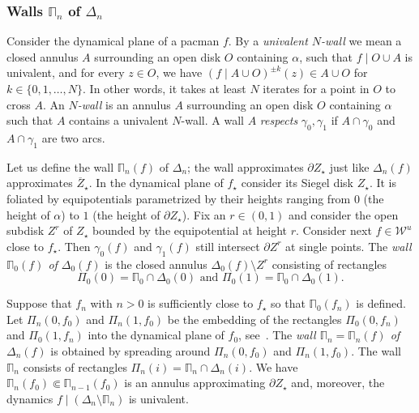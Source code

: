 \documentclass{amsart}
\newcommand{\1}{{\mathbb 1 }}
\newcommand{\bDelta}{{\mathbb{\Delta}}}
\newcommand{\bPi}{{\mathbb{\Pi}}}
\newcommand{\str}{{\star}}
\newcommand\WW{\mathcal{W}}
\theoremstyle{remark}
\numberwithin{equation}{section}
\theoremstyle{definition}
\theoremstyle{nonumberbreak}
\begin{document}
\subsubsection{Walls $\bPi_n$ of $\bDelta_n$}
\label{sss:walls bPi} Consider the dynamical plane of a pacman $f$. By a \emph{univalent $N$-wall} we mean a closed annulus $A$ surrounding an open disk $O$ containing $\alpha$, such that $f\mid O\cup A$ is univalent, and for every $z\in O$, we have $(f\mid A\cup O)^{\pm k}(z)\in A\cup O$ for $k\in\{0,1,\dots,  N\}$. In other words, it takes at least $N$ iterates for a point in $O$ to cross $A$. An \emph{$N$-wall} is an annulus $A$ surrounding an open disk $O$ containing $\alpha$ such that $A$ contains a univalent $N$-wall. A wall $A$ \emph{respects} $\gamma_0,\gamma_1$ if $A\cap \gamma_0$ and $A\cap \gamma_1$ are two arcs. 

Let us define the wall $\bPi_n(f)$ of $\bDelta_n$; the wall approximates $\partial Z_\str$ just like $\bDelta_n(f)$ approximates $\overline Z_\str$. In the dynamical plane of $f_\str$ consider its Siegel disk $Z_\str$. It is foliated by equipotentials parametrized by their heights
ranging from 0 (the height of $\alpha$) to $1$ (the height of $\partial Z_\str$). Fix an $r\in (0,1)$ and consider the open subdisk $Z^r$ of $Z_\str$ bounded by the equipotential at height $r$.  Consider next $f\in \WW^u$ close to $f_\str$. Then $\gamma_0(f)$ and $\gamma_1(f)$ still intersect $\partial Z^r$ at single points. The \emph{wall $\bPi_0(f)$ of $\bDelta_0(f)$} is the closed annulus $\bDelta_0(f)\setminus Z^r$ consisting of rectangles \[\Pi_0(0)= \bPi_0 \cap \Delta_0(0)\text{ and  }\Pi_0(1)= \bPi_0 \cap \Delta_0(1).\] 


Suppose that $f_n$ with $n>0$ is sufficiently close to $f_\str$ so that $\bPi_0(f_n)$ is defined. Let $\Pi_n(0,f_0)$ and $\Pi_n(1,f_0)$ be the embedding of the rectangles  $\Pi_0(0,f_n)$ and $\Pi_0(1,f_n)$ into the dynamical plane of $f_0$, see~\cite[Lemma 4.2, (2)]{DLS}. The \emph{wall $\bPi_n=\bPi_n(f)$ of $\bDelta_n(f)$} is obtained by spreading around $\Pi_n(0,f_0)$ and $\Pi_n(1,f_0)$. The wall $\bPi_n$ consists of rectangles $\Pi_n(i)=\bPi_n\cap \Delta_n(i)$. We have $\bPi_n(f_0)\Subset \bPi_{n-1}(f_0)$ is an annulus approximating  $\partial Z_\str$ and, moreover, the dynamics $f\mid (\bDelta_n\setminus \bPi_n)$ is univalent.
\end{document}
